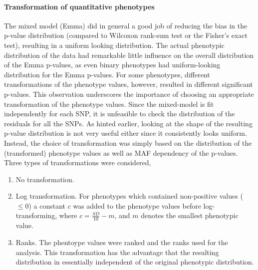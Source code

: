 \documentclass[10pt]{article}
\begin{document}
\paragraph*{Transformation of quantitative phenotypes}

The mixed model (Emma) did in general a good job of reducing the bias in the p-value distribution (compared to Wilcoxon rank-sum test or the Fisher's exact test), resulting in a uniform looking distribution.  The actual phenotypic distribution of the data had remarkable little influence on the overall distribution of the Emma p-values, as even binary phenotypes had uniform-looking distribution for the Emma p-values.  For some phenotypes, different transformations of the phenotype values, however, resulted in different significant p-values.  This observation underscores the importance of choosing an appropriate transformation of the phenotype values.  Since the mixed-model is fit independently for each SNP, it is unfeasible to check the distribution of the residuals for all the SNPs.  As hinted earlier, looking at the shape of the resulting p-value distribution is not very useful either since it consistently looks uniform.  Instead, the choice of transformation was simply based on the distribution of the (transformed) phenotype values as well as MAF dependency of the p-values.  Three types of transformations were considered, 

\begin{enumerate} 

\item No transformation.  

\item Log transformation.  For phenotypes which contained non-positive values ($\le 0$) a constant $c$ was added to the phenotype values before log-transforming, where $c=\frac{SD}{10}-m$, and $m$ denotes the smallest phenotypic value.  

\item Ranks. The phentoype values were ranked and the ranks used for the analysis.  This transformation has the advantage that the resulting distribution in essentially independent of the original phenotypic distribution.  

\end{enumerate}

\end{document}

